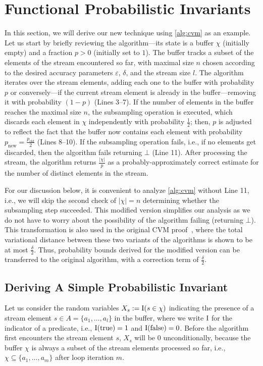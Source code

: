 \section{Functional Probabilistic Invariants}\label{sec:invariants}
In this section, we will derive our new technique using \cref{alg:cvm} as an example.
Let us start by briefly reviewing the algorithm---its state is a buffer $\chi$ (initially empty) and a fraction $p > 0$ (initially set to $1$).
The buffer tracks a subset of the elements of the stream encountered so far, with maximal size $n$ chosen according to the desired accuracy parameters $\varepsilon$, $\delta$, and the stream size $l$.
The algorithm iterates over the stream elements, adding each one to the buffer with probability $p$ or conversely---if the current stream element is already in the buffer---removing it with probability $(1-p)$ (Lines 3--7).
If the number of elements in the buffer reaches the maximal size $n$, the subsampling operation is executed, which discards each element in $\chi$ independently with probability $\frac{1}{2}$; then, $p$ is adjusted to reflect the fact that the buffer now contains each element with probability $p_\text{new} = \frac{p_\text{old}}{2}$ (Lines 8--10).
If the subsampling operation fails, i.e., if no elements get discarded, then the algorithm fails returning $\bot$ (Line 11).
After processing the stream, the algorithm returns $\frac{|\chi|}{p}$ as a probably-approximately correct estimate for the number of distinct elements in the stream.

\begin{remark}
For our discussion below, it is convenient to analyze \cref{alg:cvm} without Line 11, i.e., we will skip the second check of $|\chi|=n$ determining whether the subsampling step succeeded.
This modified version simplifies our analysis as we do not have to worry about the possibility of the algorithm failing (returning $\bot$).
This transformation is also used in the original CVM proof~\cite{chakraborty2023}, where the total variational distance between these two variants of the algorithms is shown to be at most $\frac{\delta}{2}$.
Thus, probability bounds derived for the modified version can be transferred to the original algorithm, with a correction term of $\frac{\delta}{2}$.
\lipicsEnd\end{remark}

\subsection{Deriving A Simple Probabilistic Invariant}
Let us consider the random variables $X_s := \operatorname{\mathrm{I}}(s \in \chi)$ indicating the presence of a stream element $s \in A = \{a_1,\ldots,a_l\}$ in the buffer, where we write $\operatorname{\mathrm{I}}$ for the indicator of a predicate, i.e., $\operatorname{\mathrm{I}}(\mathrm{true}) = 1$ and $\operatorname{\mathrm{I}}(\mathrm{false}) = 0$.
Before the algorithm first encounters the stream element $s$, $X_s$ will be $0$ unconditionally, because the buffer $\chi$ is always a subset of the stream elements processed so far, i.e., $\chi \subseteq \{a_1,\dots,a_m\}$ after loop iteration $m$.

